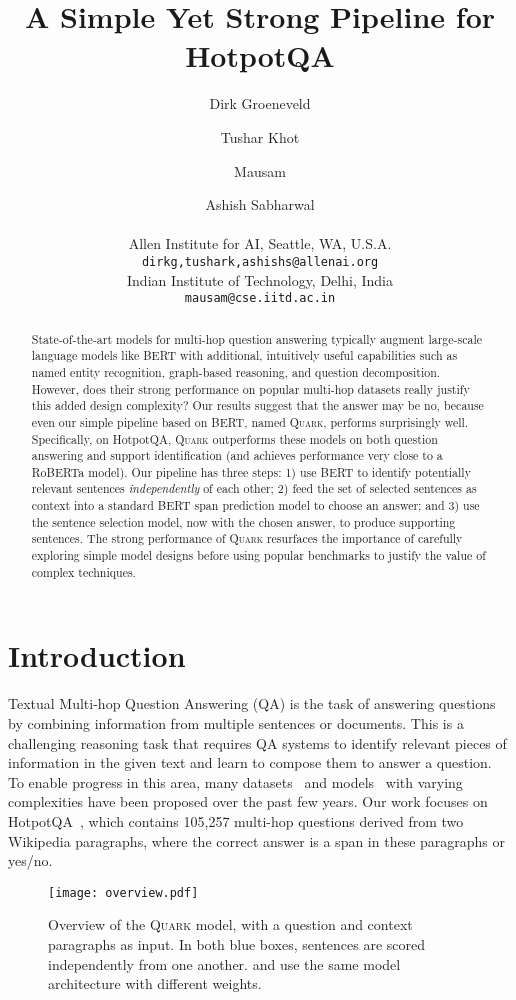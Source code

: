 \documentclass[11pt,a4paper]{article}
\title{A Simple Yet Strong Pipeline for {HotpotQA}}
\author{
Dirk Groeneveld \and Tushar Khot \and Mausam \and Ashish Sabharwal\\
  \ \\
   Allen Institute for AI, Seattle, WA, U.S.A.\\
  \texttt{\small dirkg,tushark,ashishs@allenai.org} \\
   Indian Institute of Technology, Delhi, India\\
  \texttt{\small mausam@cse.iitd.ac.in}
}
\date{}
\newcommand\model{\textsc{Quark}\xspace}
\newcommand{\hpqa}{HotpotQA\xspace}
\newcommand{\roberta}{RoBERTa\xspace}
\begin{document}
\maketitle

\begin{abstract}
State-of-the-art models for multi-hop question answering typically augment large-scale language models like BERT with additional, intuitively useful capabilities such as named entity recognition, graph-based reasoning, and question decomposition. However, does their strong performance on popular multi-hop datasets really justify this added design complexity? Our results suggest that the answer may be no, because even our simple pipeline based on BERT, named \model, performs surprisingly well. Specifically, on \hpqa, \model outperforms these models on both question answering and support identification (and achieves performance very close to a \roberta model). Our pipeline has three steps: 1) use BERT to identify potentially relevant sentences \emph{independently} of each other; 2) feed the set of selected sentences as context into a standard BERT span prediction model to choose an answer; and 3) use the sentence selection model, now with the chosen answer, to produce supporting sentences. The strong performance of \model resurfaces the importance of carefully exploring simple model designs before using popular benchmarks to justify the value of complex techniques.
\end{abstract}


\section{Introduction}

Textual Multi-hop Question Answering (QA) is the task of answering questions by combining information from multiple sentences or documents. This is a challenging reasoning task that requires QA systems to identify relevant pieces of information in the given text and learn to compose them to answer a question. To enable progress in this area, many datasets~\cite{wikihop,Talmor2018TheWA,hotpotqa,qasc} and models~\cite{decomprc,dfgn,sae} with varying complexities have been proposed over the past few years. Our work focuses on \hpqa~\cite{hotpotqa}, which contains 105,257 multi-hop questions derived from two Wikipedia paragraphs, where the correct answer is a span in these paragraphs or yes/no. 

\begin{figure}
    \centering
    \texttt{[image: overview.pdf]}
    \caption{Overview of the \model model, with a question and context paragraphs as input. In both blue boxes, sentences are scored independently from one another.  and  use the same model architecture with different weights.}
    \label{fig:model}
\end{figure}
\end{document}

